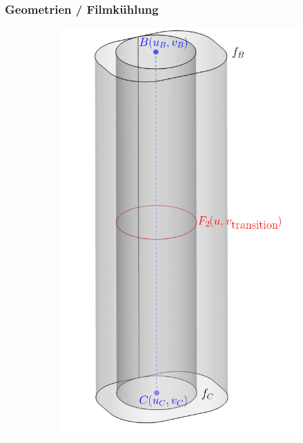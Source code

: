 \documentclass[8pt, aspectratio=169]{beamer}
\begin{document}
\begin{frame}
	\frametitle{Geometrien / Filmkühlung}
	\vspace{0cm}
	\centering
	\begin{minipage}[t]{\textwidth}
		\begin{figure}[H]
			\centering
			\begin{subfigure}{.25\textwidth}
				\includegraphics[width=\textwidth]{../../tec/holes/00edit.png}
			\end{subfigure}
			\begin{subfigure}{.25\textwidth}

\end{subfigure}
\end{figure}
\end{minipage}
\end{frame}
\end{document}
